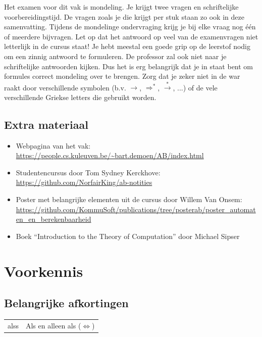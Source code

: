 \documentclass[a4paper]{article}
\begin{document}
Het examen voor dit vak is mondeling. Je krijgt twee vragen en schriftelijke voorbereidingstijd. De vragen zoals je die krijgt per stuk staan zo ook in deze samenvatting. Tijdens de mondelinge ondervraging krijg je bij elke vraag nog \'e\'en of meerdere bijvragen. Let op dat het antwoord op veel van de examenvragen niet letterlijk in de cursus staat! Je hebt meestal een goede grip op de leerstof nodig om een zinnig antwoord te formuleren. De professor zal ook niet naar je schriftelijke antwoorden kijken. Dus het is erg belangrijk dat je in staat bent om formules correct mondeling over te brengen. Zorg dat je zeker niet in de war raakt door verschillende symbolen (b.v. $\rightarrow$, $\Rightarrow^*$, $\stackrel{*}{\longrightarrow}$, ...) of de vele verschillende Griekse letters die gebruikt worden.

\subsection{Extra materiaal}
\begin{itemize}
\item Webpagina van het vak:\\\url{https://people.cs.kuleuven.be/~bart.demoen/AB/index.html}
\item Studentencursus door Tom Sydney Kerckhove:\\\url{https://github.com/NorfairKing/ab-notities}
\item Poster met belangrijke elementen uit de cursus door Willem Van Onsem:\\\url{https://github.com/KommuSoft/publications/tree/posterab/poster_automaten_en_berekenbaarheid}
\item Boek ``Introduction to the Theory of Computation'' door Michael Sipser
\end{itemize}


\newpage

\section{Voorkennis}

\subsection{Belangrijke afkortingen}

\begin{tabular}{l|l}
	alss & Als en alleen als ($\Leftrightarrow$) \\
\end{tabular}
\end{document}
